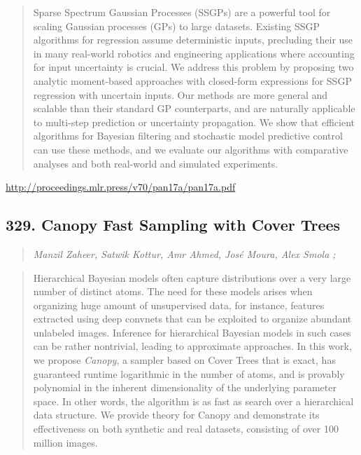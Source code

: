 \documentclass{article}
\begin{document}
\begin{quote}
    Sparse Spectrum Gaussian Processes (SSGPs) are a powerful tool for scaling Gaussian processes (GPs) to large datasets. Existing SSGP algorithms for regression assume deterministic inputs, precluding their use in many real-world robotics and engineering applications where accounting for input uncertainty is crucial. We address this problem by proposing two analytic moment-based approaches with closed-form expressions for SSGP regression with uncertain inputs. Our methods are more general and scalable than their standard GP counterparts, and are naturally applicable to multi-step prediction or uncertainty propagation. We show that efficient algorithms for Bayesian filtering and stochastic model predictive control can use these methods, and we evaluate our algorithms with comparative analyses and both real-world and simulated experiments.  \end{quote}

\href{http://proceedings.mlr.press/v70/pan17a/pan17a.pdf}{http://proceedings.mlr.press/v70/pan17a/pan17a.pdf}

\subsection{329. Canopy  Fast Sampling with Cover Trees}

\begin{quote}
\footnotesize{\textit{Manzil Zaheer, Satwik Kottur, Amr Ahmed, José Moura, Alex Smola ;}}
\end{quote}

\begin{quote}
    Hierarchical Bayesian models often capture distributions over a very large number of distinct atoms. The need for these models arises when organizing huge amount of unsupervised data, for instance, features extracted using deep convnets that can be exploited to organize abundant unlabeled images. Inference for hierarchical Bayesian models in such cases can be rather nontrivial, leading to approximate approaches. In this work, we propose \textit{Canopy}, a sampler based on Cover Trees that is exact, has guaranteed runtime logarithmic in the number of atoms, and is provably polynomial in the inherent dimensionality of the underlying parameter space. In other words, the algorithm is as fast as search over a hierarchical data structure. We provide theory for Canopy and demonstrate its effectiveness on both synthetic and real datasets, consisting of over 100 million images.  \end{quote}
\end{document}
